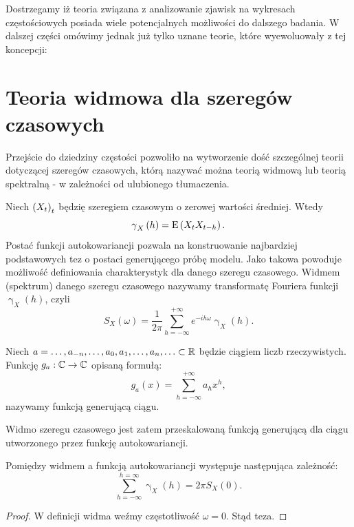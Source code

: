 \documentclass[10pt,a4paper]{book}
\newcommand{\tsAutoCovariance}[3][\gamma]{\operatorname{#1}_{#2} \left({#3}\right)}
\begin{document}
Dostrzegamy iż teoria związana z analizowanie zjawisk na wykresach częstościowych posiada wiele potencjalnych możliwości do dalszego badania. W dalszej części omówimy jednak już tylko uznane teorie, które wyewoluowały z tej koncepcji:

\section{Teoria widmowa dla szeregów czasowych}

Przejście do dziedziny częstości pozwoliło na wytworzenie dość szczególnej teorii dotyczącej szeregów czasowych, którą nazywać można teorią widmową lub teorią spektralną - w zależności od ulubionego tłumaczenia.

\begin{definition}
Niech $\left({X_t}\right)_{t}$ będzię szeregiem czasowym o zerowej wartości średniej. Wtedy
$$
\tsAutoCovariance{X}{h} = \Ex{X_t X_{t-h}}.
$$
Postać funkcji autokowariancji pozwala na konstruowanie najbardziej podstawowych tez o postaci generującego próbę modelu. Jako takowa powoduje możliwość definiowania charakterystyk dla danego szeregu czasowego. Widmem (spektrum) danego szeregu czasowego nazywamy transformatę Fouriera funkcji $\tsAutoCovariance{X}{h}$, czyli
$$
S_X(\omega) = \frac{1}{2\pi} \sum_{h=-\infty}^{+\infty} e^{-ih\omega} \tsAutoCovariance{X}{h}.
$$
\end{definition}

\begin{definition}
Niech $a = \ldots, a_{-n}, \ldots, a_0, a_1, \ldots, a_n, \ldots \subset \mathbb{R} $ będzie ciągiem liczb rzeczywistych. Funkcję $g_a : \mathbb{C} \to \mathbb{C}$ opisaną formułą:
$$
g_a(x) = \sum_{h= -\infty}^{+\infty} a_h x^{h},
$$
nazywamy funkcją generującą ciągu.
\end{definition}

\begin{remark*}
Widmo szeregu czasowego jest zatem przeskalowaną funkcją generującą dla ciągu utworzonego przez funkcję autokowariancji. 
\end{remark*}

\begin{corollary}[]
Pomiędzy widmem a funkcją autokowariancji występuje następująca zależność:
$$
\sum_{h=-\infty}^{h=\infty} \tsAutoCovariance{X}{h} = 2\pi S_X(0).
$$
\end{corollary}

\begin{proof}
W definicji widma weźmy częstotliwość $\omega = 0$. Stąd teza.
\end{proof}
\end{document}
